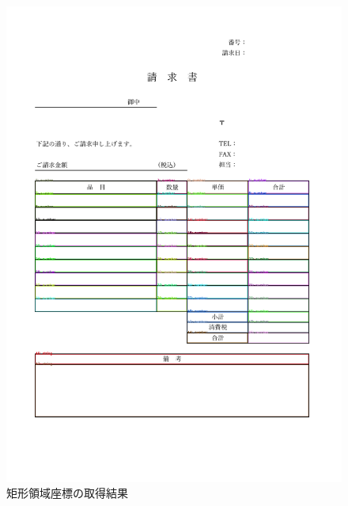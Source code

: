 \begin{figure}[t]
    \begin{center}
        \includegraphics[width=15cm]{image/05-indication/rects_with_label.png}
        \caption{矩形領域座標の取得結果}
        \label{fig:rects_with_label}
    \end{center}
\end{figure}

